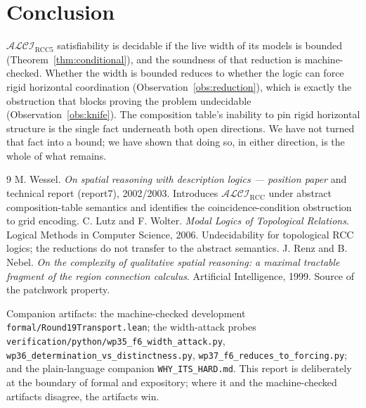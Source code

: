 \documentclass[11pt]{article}
\newcommand{\ALCIRCC}{\mathcal{ALCI}_{\mathrm{RCC5}}}
\newcommand{\code}[1]{\texttt{#1}}
\theoremstyle{plain}
\theoremstyle{definition}
\begin{document}
\section{Conclusion}

$\ALCIRCC$ satisfiability is decidable if the live width of its models
is bounded (Theorem~\ref{thm:conditional}), and the soundness of that
reduction is machine-checked. Whether the width is bounded reduces to
whether the logic can force rigid horizontal coordination
(Observation~\ref{obs:reduction}), which is exactly the obstruction
that blocks proving the problem undecidable
(Observation~\ref{obs:knife}). The composition table's inability to pin
rigid horizontal structure is the single fact underneath both open
directions. We have not turned that fact into a bound; we have shown
that doing so, in either direction, is the whole of what remains.

\begin{thebibliography}{9}
 M. Wessel.
\emph{On spatial reasoning with description logics --- position paper}
and technical report (report7), 2002/2003. Introduces
$\mathcal{ALCI}_{\mathrm{RCC}}$ under abstract composition-table
semantics and identifies the coincidence-condition obstruction to grid
encoding.
 C. Lutz and F. Wolter.
\emph{Modal Logics of Topological Relations}. Logical Methods in
Computer Science, 2006. Undecidability for topological RCC logics; the
reductions do not transfer to the abstract semantics.
 J. Renz and B. Nebel.
\emph{On the complexity of qualitative spatial reasoning: a maximal
tractable fragment of the region connection calculus}. Artificial
Intelligence, 1999. Source of the patchwork property.
\end{thebibliography}

\vfill
\noindent\footnotesize
Companion artifacts: the machine-checked development
\code{formal/Round19Transport.lean}; the width-attack probes
\code{verification/python/wp35\_f6\_width\_attack.py},
\code{wp36\_determination\_vs\_distinctness.py},
\code{wp37\_f6\_reduces\_to\_forcing.py}; and the plain-language
companion \code{WHY\_ITS\_HARD.md}. This report is deliberately at the
boundary of formal and expository; where it and the machine-checked
artifacts disagree, the artifacts win.
\end{document}
